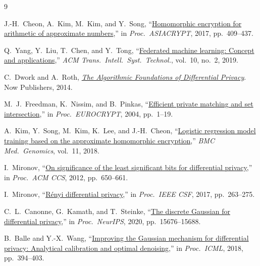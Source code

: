 \documentclass[12pt]{article}
\theoremstyle{definition}
\theoremstyle{plain}
\begin{document}
\begin{thebibliography}{9}

J.-H.~Cheon, A.~Kim, M.~Kim, and Y.~Song,
``\href{https://doi.org/10.1007/978-3-319-70694-8_15}{Homomorphic encryption for arithmetic of approximate numbers},''
in \textit{Proc.\ ASIACRYPT}, 2017, pp.\ 409--437.

Q.~Yang, Y.~Liu, T.~Chen, and Y.~Tong,
``\href{https://dl.acm.org/doi/10.1145/3298981}{Federated machine learning: Concept and applications},''
\textit{ACM Trans.\ Intell.\ Syst.\ Technol.}, vol.~10, no.~2, 2019.

C.~Dwork and A.~Roth,
\textit{\href{https://doi.org/10.1561/0400000042}{The Algorithmic Foundations of Differential Privacy}}.
Now Publishers, 2014.

M.~J.~Freedman, K.~Nissim, and B.~Pinkas,
``\href{https://doi.org/10.1007/978-3-540-24676-3_1}{Efficient private matching and set intersection},''
in \textit{Proc.\ EUROCRYPT}, 2004, pp.\ 1--19.

A.~Kim, Y.~Song, M.~Kim, K.~Lee, and J.-H.~Cheon,
``\href{https://bmcmedgenomics.biomedcentral.com/articles/10.1186/s12920-018-0401-7}{Logistic regression model training based on the approximate homomorphic encryption},''
\textit{BMC Med.\ Genomics}, vol.~11, 2018.

I.~Mironov,
``\href{https://dl.acm.org/doi/10.1145/2382196.2382264}{On significance of the least significant bits for differential privacy},''
in \textit{Proc.\ ACM CCS}, 2012, pp.\ 650--661.

I.~Mironov,
``\href{https://www.computer.org/csdl/proceedings-article/csf/2017/3217a263/12OmNzn38LX}{R\'{e}nyi differential privacy},''
in \textit{Proc.\ IEEE CSF}, 2017, pp.\ 263--275.

C.~L.~Canonne, G.~Kamath, and T.~Steinke,
``\href{https://proceedings.neurips.cc/paper/2020/hash/b53b3a3d6ab90ce0268229151c9bde11-Abstract.html}{The discrete Gaussian for differential privacy},''
in \textit{Proc.\ NeurIPS}, 2020, pp.\ 15676--15688.

B.~Balle and Y.-X.~Wang,
``\href{http://proceedings.mlr.press/v80/balle18a.html}{Improving the Gaussian mechanism for differential privacy: Analytical calibration and optimal denoising},''
in \textit{Proc.\ ICML}, 2018, pp.\ 394--403.

\end{thebibliography}
\end{document}
